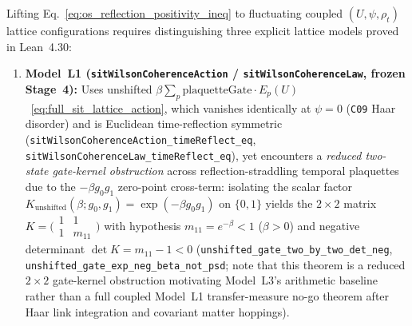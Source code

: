 Lifting Eq.~\eqref{eq:os_reflection_positivity_ineq} to fluctuating coupled $(U, \psi, \rho_t)$ lattice configurations requires distinguishing three explicit lattice models proved in Lean~4.30:
\begin{enumerate}[leftmargin=2em]
  \item \textbf{Model~L1 (\texttt{sit\allowbreak{}Wilson\allowbreak{}Coherence\allowbreak{}Action} / \texttt{sitWilsonCoherenceLaw}, frozen Stage~4):} Uses unshifted $\beta\sum_p \mathrm{plaquetteGate}\cdot E_p(U)$~\eqref{eq:full_sit_lattice_action}, which vanishes identically at $\psi = 0$ (\texttt{C09} Haar disorder) and is Euclidean time-reflection symmetric (\texttt{sit\allowbreak{}Wilson\allowbreak{}Coherence\allowbreak{}Action\_\allowbreak{}time\allowbreak{}Reflect\_\allowbreak{}eq}, \texttt{sit\allowbreak{}Wilson\allowbreak{}Coherence\allowbreak{}Law\_\allowbreak{}time\allowbreak{}Reflect\_\allowbreak{}eq}), yet encounters a \emph{reduced two-state gate-kernel obstruction} across reflection-straddling temporal plaquettes due to the $-\beta g_0 g_1$ zero-point cross-term: isolating the scalar factor $K_{\mathrm{unshifted}}(\beta; g_0, g_1) = \exp(-\beta g_0 g_1)$ on $\{0, 1\}$ yields the $2\times 2$ matrix $K = \bigl(\begin{smallmatrix}1 & 1\\ 1 & m_{11}\end{smallmatrix}\bigr)$ with hypothesis $m_{11} = e^{-\beta} < 1$ ($\beta > 0$) and negative determinant $\det K = m_{11} - 1 < 0$ (\texttt{unshifted\_\allowbreak{}gate\_\allowbreak{}two\_\allowbreak{}by\_\allowbreak{}two\_\allowbreak{}det\_\allowbreak{}neg}, \texttt{unshifted\_\allowbreak{}gate\_\allowbreak{}exp\_\allowbreak{}neg\_\allowbreak{}beta\_\allowbreak{}not\_\allowbreak{}psd}; note that this theorem is a reduced $2\times 2$ gate-kernel obstruction motivating Model~L3's arithmetic baseline rather than a full coupled Model~L1 transfer-measure no-go theorem after Haar link integration and covariant matter hoppings).

\end{enumerate}
